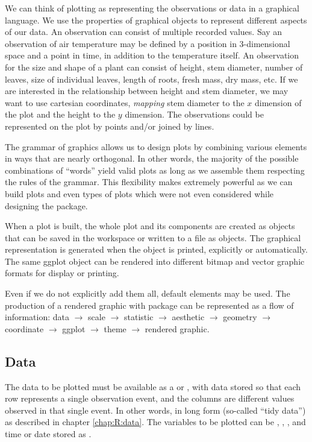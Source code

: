 \documentclass[krantz2]{krantz}\usepackage{knitr}
\begin{document}
We can think of plotting as representing the observations or data in a graphical language. We use the properties of graphical objects to represent different aspects of our data. An observation can consist of multiple recorded values. Say an observation of air temperature may be defined by a position in 3-dimensional space and a point in time, in addition to the temperature itself. An observation for the size and shape of a plant can consist of height, stem diameter, number of leaves, size of individual leaves, length of roots, fresh mass, dry mass, etc. If we are interested in the relationship between height and stem diameter, we may want to use cartesian coordinates, \emph{mapping} stem diameter to the $x$ dimension of the plot and the height to the $y$ dimension. The observations could be represented on the plot by points and/or joined by lines.

The grammar of graphics allows us to design plots by combining various elements in ways that are nearly orthogonal. In other words, the majority of the possible combinations of ``words'' yield valid plots as long as we assemble them respecting the rules of the grammar. This flexibility makes \ggplot extremely powerful as we can build plots and even types of plots which were not even considered while designing the \ggplot package.

When a plot is built, the whole plot and its components are created as \Rlang objects that can be saved in the workspace or written to a file as objects. The graphical representation is generated when the object is printed, explicitly or automatically. The same ggplot object can be rendered into different bitmap and vector graphic formats for display or printing.

Even if we do not explicitly add them all, default elements may be used. The production of a rendered graphic with package  can be represented as a flow of information:
\textsf{data $\to$ scale $\to$ statistic $\to$ aesthetic $\to$ geometry $\to$ coordinate $\to$ ggplot $\to$ theme $\to$ rendered graphic}.

\subsection{Data}
The data to be plotted must be available as a  or , with data stored so that each row represents a single observation event, and the columns are different values observed in that single event. In other words, in long form (so-called ``tidy data'') as described in chapter \ref{chap:R:data}. The variables to be plotted can be , , , and time or date stored as .
\end{document}
